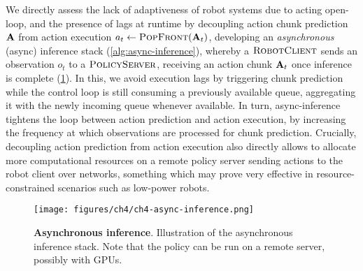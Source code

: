 We directly assess the lack of adaptiveness of robot systems due to acting open-loop, and the presence of lags at runtime by decoupling action chunk prediction \( \mathbf{A} \) from action execution \( a_t \gets \textsc{PopFront}(\mathbf{A}_t) \), developing an \emph{asynchronous} (async) inference stack (\ref{alg:async-inference}), whereby a \( \textsc{RobotClient} \) sends an observation \( o_t \) to a \( \textsc{PolicyServer} \), receiving an action chunk \( \mathbf{A}_t \) once inference is complete (\ref{fig:ch4-async-inference}).
In this, we avoid execution lags by triggering chunk prediction while the control loop is still consuming a previously available queue, aggregating it with the newly incoming queue whenever available.
In turn, async-inference tightens the loop between action prediction and action execution, by increasing the frequency at which observations are processed for chunk prediction.
Crucially, decoupling action prediction from action execution also directly allows to allocate more computational resources on a remote policy server sending actions to the robot client over networks, something which may prove very effective in resource-constrained scenarios such as low-power robots.

\begin{figure}
    \centering
    \begin{minipage}[t]{\textwidth}
        \centering
        \texttt{[image: figures/ch4/ch4-async-inference.png]}
        \caption{\textbf{Asynchronous inference}. Illustration of the asynchronous inference stack. Note that the policy can be run on a remote server, possibly with GPUs.}
        \label{fig:ch4-async-inference}
    \end{minipage}
    \vspace{-0.6cm}
\end{figure}

